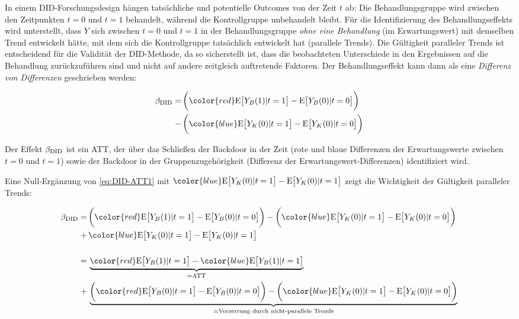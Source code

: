 \documentclass[
  a4paper,
  DIV=11,
  oneside]{scrreprt}
\begin{document}
In einem DID-Forschungsdesign hängen tatsächliche und potentielle
Outcomes von der Zeit \(t\) ab: Die Behandlungsgruppe wird zwischen den
Zeitpunkten \(t = 0\) und \(t = 1\) behandelt, während die
Kontrollgruppe unbehandelt bleibt. Für die Identifizierung des
Behandlungseffekts wird unterstellt, dass \(Y\) sich zwischen \(t=0\)
und \(t=1\) in der Behandlungsgruppe \emph{ohne eine Behandlung} (im
Erwartungswert) mit demselben Trend entwickelt hätte, mit dem sich die
Kontrollgruppe tatsächlich entwickelt hat (parallele Trends). Die
Gültigkeit paralleler Trends ist entscheidend für die Validität der
DID-Methode, da so sicherstellt ist, dass die beobachteten Unterschiede
in den Ergebnissen auf die Behandlung zurückzuführen sind und nicht auf
andere zeitgleich auftretende Faktoren. Der Behandlungseffekt kann dann
als eine \emph{Differenz von Differenzen} geschrieben werden:

\begin{align}
  \begin{split}
    \beta_\textup{DID} =& \, \bigg({\color{red}\textup{E}\big[Y_B(1)\vert t=1\big] - \textup{E}\big[Y_B(0)\vert t=0\big]} \bigg)\\
  -&\, \bigg({\color{blue}\textup{E}\big[Y_K(0)\vert t=1\big] -  \textup{E}\big[Y_K(0)\vert t=0\big]} \bigg)
  \end{split}\label{eq:DID-ATT1}
\end{align}

Der Effekt \(\beta_\textup{DID}\) ist ein ATT, der über das Schließen
der Backdoor in der Zeit (rote und blaue Differenzen der Erwartungswerte
zwischen \(t=0\) und \(t=1\)) sowie der Backdoor in der
Gruppenzugehörigkeit (Differenz der Erwartungswert-Differenzen)
identifiziert wird.

Eine Null-Ergänzung von \eqref{eq:DID-ATT1} mit
\({\color{blue}\textup{E}\big[Y_K(0)\vert t=1\big] -  \textup{E}\big[Y_K(0)\vert t=1\big]}\)
zeigt die Wichtigkeit der Gültigkeit paralleler Trends:

\begin{align*}
    \beta_\textup{DID} =& \, \bigg({\color{red}\textup{E}\big[Y_B(1)\vert t=1\big] - \textup{E}\big[Y_B(0)\vert t=0\big]} \bigg)
  - \bigg({\color{blue}\textup{E}\big[Y_K(0)\vert t=1\big] -  \textup{E}\big[Y_K(0)\vert t=0\big]} \bigg)\\ + &\,
{\color{blue}\textup{E}\big[Y_K(0)\vert t=1\big] -  \textup{E}\big[Y_K(0)\vert t=1\big]}\\
    \\
    =&\, \underbrace{{\color{red}\textup{E}\big[Y_B(1)\vert t=1\big]} - {\color{blue}\textup{E}\big[Y_B(1)\vert t=1\big]}}_{=\textup{ATT}}\\
    +&\, \underbrace{\bigg({\color{red}\textup{E}\big[Y_B(0)\vert t=1\big] - \textup{E}\big[Y_B(0)\vert t=0\big]} \bigg) - \bigg({\color{blue}\textup{E}\big[Y_K(0)\vert t=1\big] -  \textup{E}\big[Y_K(0)\vert t=0\big]} \bigg)}_{ = \textup{Verzerrung durch nicht-parallele Trends}}
\end{align*}
\end{document}
